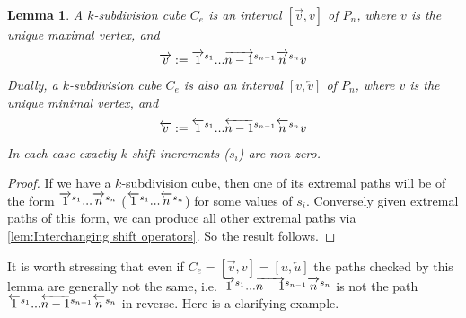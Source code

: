 \documentclass{amsart}
\newtheorem{lemma}[theorem]{Lemma}
\theoremstyle{definition}
\newcommand{\rightshiftk}[2]{\overrightarrow{\vphantom{1}{#1}}^{#2}}
\newcommand{\leftshiftk}[2]{\overleftarrow{\vphantom{1}{#1}}^{#2}}
\newcommand{\subdivcubeofe}{C_e}
\begin{document}
\begin{lemma} \label{lem:subdiv cubes are intervals}
A $k$-subdivision cube $\subdivcubeofe$ is an interval $[\overrightarrow{v},v]$ of $P_n$, where $v$ is the unique maximal vertex, and 
\begin{align*}
    \overrightarrow{v}:= \rightshiftk{1}{s_1}... \rightshiftk{n-1}{s_{n-1}}\rightshiftk{n}{s_n}v
\end{align*}
Dually, a $k$-subdivision cube $\subdivcubeofe$ is also an interval $[v,\overleftarrow{v}]$ of $P_n$, where $v$ is the unique minimal vertex, and 
\begin{align*}
    \overleftarrow{v} :=\leftshiftk{1}{s_1}...\leftshiftk{n-1}{s_{n-1}}\leftshiftk{n}{s_n}v
\end{align*}
In each case exactly $k$ shift increments ($s_i$) are non-zero.
\end{lemma}
\begin{proof}
If we have a $k$-subdivision cube, then one of its extremal paths will be of the form
$\rightshiftk{1}{s_1}... \rightshiftk{n}{s_n}$ ($\leftshiftk{1}{s_1}...\leftshiftk{n}{s_n}$) for some values of $s_i$.
Conversely given extremal paths of this form, we can produce all other extremal paths via \cref{lem:Interchanging shift operators}. So the result follows.

\end{proof}
It is worth stressing that even if $C_e =[\overrightarrow{v},v] = [u,\overleftarrow{u}]$ the paths checked by this lemma are generally not the same, i.e. $\rightshiftk{1}{s_1}... \rightshiftk{n-1}{s_{n-1}}\rightshiftk{n}{s_n}$ is not the path $\leftshiftk{1}{s_1}...\leftshiftk{n-1}{s_{n-1}}\leftshiftk{n}{s_n}$ in reverse. 
Here is a clarifying example.
\end{document}

